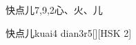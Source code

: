 \begin{entry}{快点儿}{7,9,2}{⼼、⽕、⼉}
  \begin{phonetics}{快点儿}{kuai4 dian3r5}[][HSK 2]
  \end{phonetics}
\end{entry}
